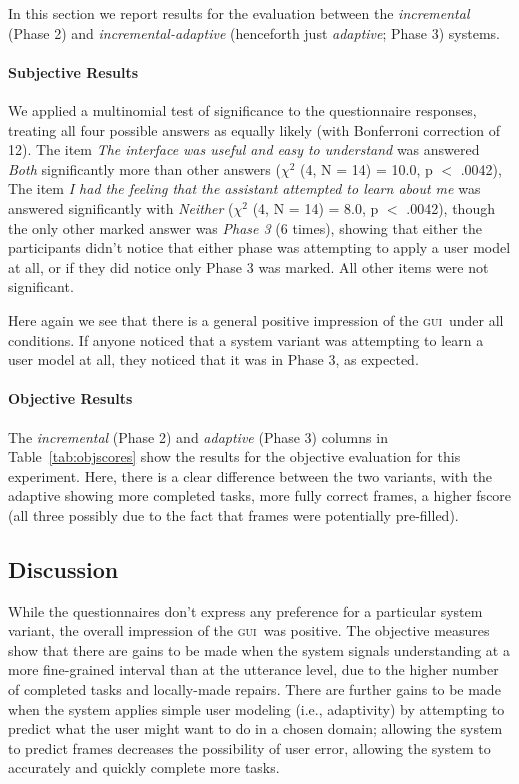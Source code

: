 \documentclass[11pt]{article}
\newcommand{\ui}[0]{\textsc{gui}}
\begin{document}
In this section we report results for the evaluation between the \emph{incremental} (Phase 2) and \emph{incremental-adaptive} (henceforth just \emph{adaptive}; Phase 3) systems. 

\paragraph{Subjective Results}  We applied a multinomial test of significance to the questionnaire responses, treating all four possible answers as equally likely (with Bonferroni correction of 12). The item \emph{The interface was useful and easy to understand} was answered \emph{Both} significantly more than other answers  ($ \chi^2 $ (4, N = 14) = 10.0, p $<$ .0042), The item \emph{I had the feeling that the assistant attempted to learn about me} was answered significantly with \emph{Neither} ($ \chi^2 $ (4, N = 14) = 8.0, p $<$ .0042), though the only other marked answer was \emph{Phase 3} (6 times), showing that either the participants didn't notice that either phase was attempting to apply a user model at all, or if they did notice only Phase 3 was marked. All other items were not significant.

Here again we see that there is a general positive impression of the \ui\ under all conditions. If anyone noticed that a system variant was attempting to learn a user model at all, they noticed that it was in Phase 3, as expected. 

\paragraph{Objective Results} The \emph{incremental} (Phase 2) and \emph{adaptive} (Phase 3) columns in Table~\ref{tab:objscores} show the results for the objective evaluation for this experiment. Here, there is a clear difference between the two variants, with the adaptive showing more completed tasks, more fully correct frames, a higher fscore (all three possibly due to the fact that frames were potentially pre-filled). 

\subsection{Discussion}

While the questionnaires don't express any preference for a particular system variant, the overall impression of the \ui\ was positive. The objective measures show that there are gains to be made when the system signals understanding at a more fine-grained interval than at the utterance level, due to the higher number of completed tasks and locally-made repairs. There are further gains to be made when the system applies simple user modeling (i.e., adaptivity) by attempting to predict what the user might want to do in a chosen domain; allowing the system to predict frames decreases the possibility of user error, allowing the system to accurately and quickly complete more tasks. 
\end{document}
